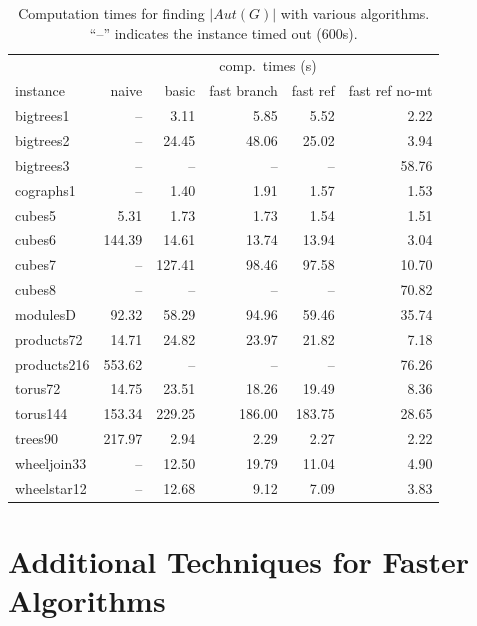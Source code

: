 \documentclass[twoside]{article}
\begin{document}
\begin{table}[H]
\centering
\begin{tabular}{l|r|r|r|r|r}
& \multicolumn{5}{c}{comp.\ times (s)}\\
instance & naive & basic & fast branch & fast ref & fast ref no-mt\footnotemark \\
\noalign{\smallskip}\hline\hline\noalign{\smallskip}
bigtrees1    & --     & 3.11   & 5.85   & 5.52   & 2.22 \\
bigtrees2    & --     & 24.45  & 48.06  & 25.02  & 3.94 \\
bigtrees3    & --     & --     & --     & --     & 58.76 \\
cographs1    & --     & 1.40   & 1.91   & 1.57   & 1.53 \\
cubes5       & 5.31   & 1.73   & 1.73   & 1.54   & 1.51 \\
cubes6       & 144.39 & 14.61  & 13.74  & 13.94  & 3.04 \\
cubes7       & --     & 127.41 & 98.46  & 97.58  & 10.70 \\
cubes8       & --     & --     & --     & --     & 70.82 \\
modulesD     & 92.32  & 58.29  & 94.96  & 59.46  & 35.74 \\
products72   & 14.71  & 24.82  & 23.97  & 21.82  & 7.18 \\
products216  & 553.62 & --     & --     & --     & 76.26 \\
torus72      & 14.75  & 23.51  & 18.26  & 19.49  & 8.36 \\
torus144     & 153.34 & 229.25 & 186.00 & 183.75 & 28.65 \\
trees90      & 217.97 & 2.94   & 2.29   & 2.27   & 2.22 \\
wheeljoin33  & --     & 12.50  & 19.79  & 11.04  & 4.90 \\
wheelstar12  & --     & 12.68  & 9.12   & 7.09   & 3.83 \\
\end{tabular}
\caption{Computation times for finding $|Aut(G)|$ with various algorithms. ``--'' indicates the instance timed out (600s).}
\label{tab:aut_counting}
\end{table}

\section{Additional Techniques for Faster Algorithms}
\end{document}
